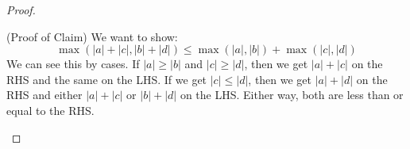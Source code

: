 \documentclass{article}
\begin{document}
\begin{proof}
\begin{itemize}
                (Proof of Claim) We want to show:
                    \begin{equation*}
                        \max(\lvert a \rvert + \lvert c \rvert, \lvert b \rvert + \lvert d \rvert) \leq \max(\lvert a \rvert, \lvert b \rvert) + \max(\lvert c \rvert, \lvert d \rvert)
                    \end{equation*}
                We can see this by cases. If $\lvert a \rvert \geq \lvert b \rvert$ and $\lvert c \rvert \geq \lvert d \rvert$, then we get $\lvert a \rvert + \lvert c \rvert$ on the RHS and the same on the LHS. If we get $\lvert c \rvert \leq \lvert d \rvert$, then we get $\lvert a \rvert + \lvert d \rvert$ on the RHS and either $\lvert a \rvert + \lvert c \rvert$ or $\lvert b \rvert + \lvert d \rvert$ on the LHS. Either way, both are less than or equal to the RHS.
            \end{itemize}
    \end{proof}
\end{document}
